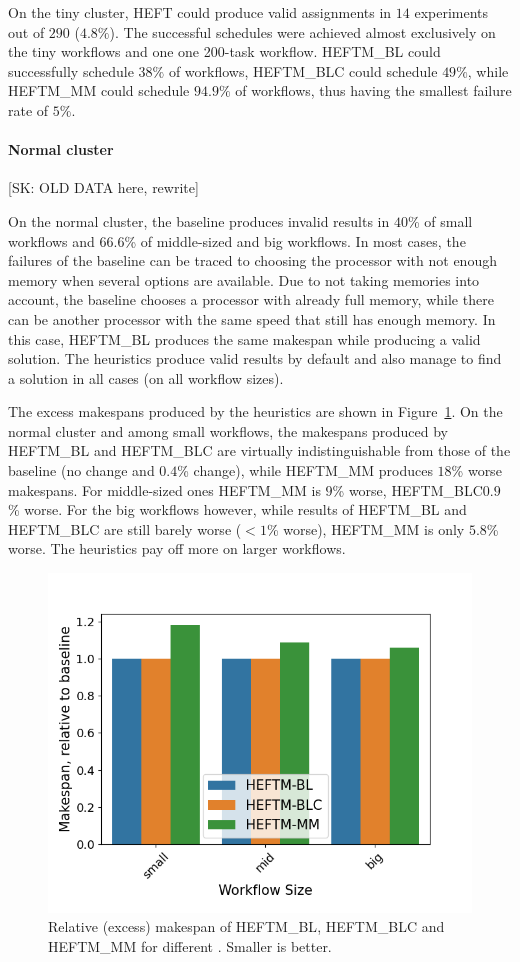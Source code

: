 \documentclass[conference]{IEEEtran}
\newcommand{\algo}[1]{\textsc{#1}}
\newcommand{\heft}{\algo{HEFT}\xspace}
\newcommand{\heftmm}{\algo{HEFTM\_MM}\xspace}
\newcommand{\heftbl}{\algo{HEFTM\_BL}\xspace}
\newcommand{\heftblc}{\algo{HEFTM\_BLC}\xspace}
\newcommand{\skug}[1]{{\color{blue}[SK: #1]}}
\begin{document}
    On the tiny cluster, \heft could produce valid assignments in $14$ experiments out of $290$ ($4.8\%$).
    The successful schedules were achieved almost exclusively on the tiny workflows and one one 200-task workflow.
    \heftbl could successfully schedule $38\%$ of workflows, \heftblc could schedule $49\%$, while \heftmm could schedule
    $94.9\%$ of workflows, thus having the smallest failure rate of $5\%$.

    \paragraph{Normal cluster}
    \skug{OLD DATA here, rewrite}

    On the normal cluster, the baseline produces invalid results in $40$\% of small workflows and $66.6$\% of middle-sized
    and big workflows.
    In most cases, the failures of the baseline can be traced to choosing the processor with not enough memory when several
    options are available.
    Due to not taking memories into account, the baseline chooses a processor with already full memory, while there can
    be another processor with the same speed that still has enough memory.
    In this case, \heftbl produces the same makespan while producing a valid solution.
    The heuristics produce valid results by default and also manage to find a solution in all cases (on all workflow sizes).

    The excess makespans produced by the heuristics are shown in Figure~\ref{fig:excess-ms}.
    On the normal cluster and among small workflows, the makespans produced by \heftbl and \heftblc are virtually indistinguishable
    from those of the baseline (no change and $0.4$\% change), while \heftmm produces  $18$\% worse makespans.
    For middle-sized ones \heftmm is $9$\% worse,  \heftblc $0.9$\% worse.
    For the big workflows however, while results of \heftbl and \heftblc are still barely worse ($<1$\% worse),
     \heftmm is only $5.8$\% worse.
    The heuristics pay off more on larger workflows.

    \begin{figure}[tb]
        \centering
        \includegraphics[width=0.495\columnwidth] {images/ms-relative-3groups}
        \caption{Relative (excess) makespan of \heftbl, \heftblc and \heftmm for different . Smaller is better.}
       \label{fig:excess-ms}
        \vspace{-0.3cm}
    \end{figure}
\end{document}
